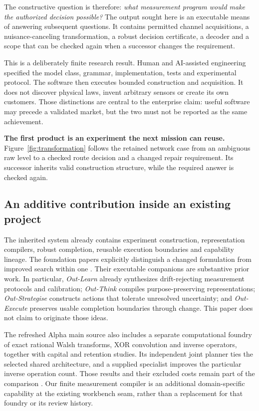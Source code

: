 \documentclass[11pt,letterpaper]{article}
\theoremstyle{definition}\newtheorem{definition}[theorem]{Definition}
\theoremstyle{remark}\newtheorem{remark}[theorem]{Remark}
\newcommand{\callout}[1]{\par\smallskip\noindent\colorbox{pale}{\begin{minipage}{\dimexpr\linewidth-2\fboxsep\relax}\vspace{.45em}\color{ink}#1\vspace{.45em}\end{minipage}}\par\smallskip}
\begin{document}
The constructive question is therefore: \emph{what measurement program would make the authorized decision possible?} The output sought here is an executable means of answering subsequent questions. It contains permitted channel acquisitions, a nuisance-canceling transformation, a robust decision certificate, a decoder and a scope that can be checked again when a successor changes the requirement.

This is a deliberately finite research result. Human and AI-assisted engineering specified the model class, grammar, implementation, tests and experimental protocol. The software then executes bounded construction and acquisition. It does not discover physical laws, invent arbitrary sensors or create its own customers. Those distinctions are central to the enterprise claim: useful software may precede a validated market, but the two must not be reported as the same achievement.

\callout{\textbf{The first product is an experiment the next mission can reuse.} Figure~\ref{fig:transformation} follows the retained network case from an ambiguous raw level to a checked route decision and a changed repair requirement. Its successor inherits valid construction structure, while the required answer is checked again.}



\subsection{An additive contribution inside an existing project}
The inherited system already contains experiment construction, representation compilers, robust completion, reusable execution boundaries and capability lineage. The foundation papers explicitly distinguish a changed formulation from improved search within one \citep{ti,learn,think,design,strategise,execute,evolve,economy}. Their executable companions are substantive prior work. In particular, \emph{Out-Learn} already synthesizes drift-rejecting measurement protocols and calibration; \emph{Out-Think} compiles purpose-preserving representations; \emph{Out-Strategise} constructs actions that tolerate unresolved uncertainty; and \emph{Out-Execute} preserves usable completion boundaries through change. This paper does not claim to originate those ideas.

The refreshed Alpha main source also includes a separate computational foundry of exact rational Walsh transforms, XOR convolution and inverse operators, together with capital and retention studies. Its independent joint planner ties the selected shared architecture, and a supplied specialist improves the particular inverse operation count. Those results and their excluded costs remain part of the comparison \citep{existingfoundry}. Our finite measurement compiler is an additional domain-specific capability at the existing workbench seam, rather than a replacement for that foundry or its review history.
\end{document}

